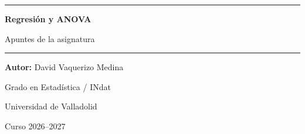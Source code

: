 \thispagestyle{empty}
\begin{center}
  \vspace*{3cm}
  \rule{\linewidth}{1.2pt}\par
  \vspace{0.6cm}
  {\Huge\bfseries Regresión y ANOVA\par}
  \vspace{0.4cm}
  {\Large Apuntes de la asignatura\par}
  \vspace{0.4cm}
  \rule{\linewidth}{1.2pt}\par
  \vspace{2cm}
  {\large \textbf{Autor:} David Vaquerizo Medina\par}
  \vspace{0.6cm}
  {\large Grado en Estadística / INdat\par}
  {\large Universidad de Valladolid\par}
  {\large Curso 2026--2027\par}
\end{center}
\clearpage
